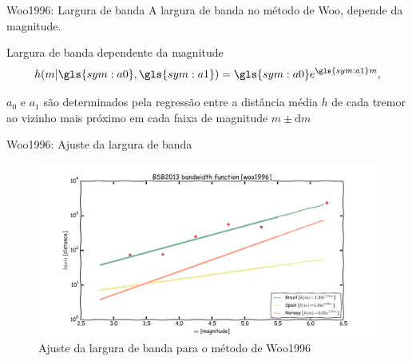 \documentclass[ucs,8pt]{beamer}
\begin{document}
\begin{frame}{Woo1996: Largura de banda}
A largura de banda no método de Woo, \alert{depende da magnitude}.
\begin{block}{Largura de banda dependente da magnitude}
	\begin{equation}
		\ensuremath{
			h(m\arrowvert \gls{sym:a0}, \gls{sym:a1}) = \gls{sym:a0}e^{\gls{sym:a1}m},
		}
		\label{eq:hm}
	\end{equation}
\end{block}
$a_0$ e $a_1$ são determinados pela regressão entre a 
distância média $h$ de cada tremor ao vizinho mais próximo em cada faixa de magnitude $m \pm \mathrm{d}m$
\end{frame}


\begin{frame}{Woo1996: Ajuste da largura de banda}
\begin{figure}[H]
  \centering
  \includegraphics[width=.95\textwidth]{woo_bandwidth} 
  \caption{Ajuste da largura de banda para o método de Woo1996}
  \label{fig:woo_b} 
\end{figure}
\end{frame}
\end{document}
